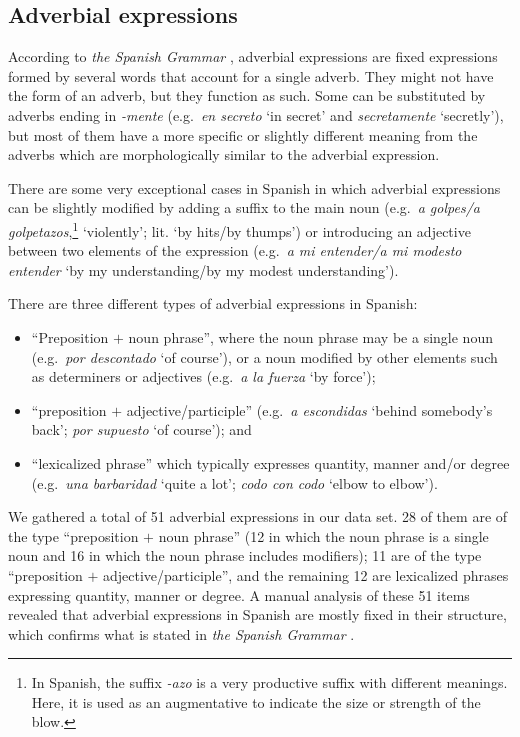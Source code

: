 \documentclass[output=paper]{langsci/langscibook}
\begin{document}
\subsection{Adverbial expressions}
\label{sssec:adverbialExps}

According to \textit{the Spanish Grammar} \citeyearpar[599]{RAE:2010}, adverbial expressions are fixed expressions formed by several words that account for a single adverb.
They might not have the form of an adverb, but they function as such.
Some can be substituted by adverbs ending in \textit{-mente} (e.g.\ \textit{en secreto} `in secret' and \textit{secretamente} `secretly'), but most of them have a more specific or slightly different meaning from the adverbs which are morphologically similar to the adverbial expression.

There are some very exceptional cases in Spanish in which adverbial expressions can be slightly modified \citep[600]{RAE:2010} by adding a suffix to the main noun (e.g.\ \textit{a golpes/a golpetazos},\footnote{In Spanish, the suffix \textit{-azo} is a very productive suffix with different meanings. Here, it is used as an augmentative to indicate the size or strength of the blow.} `violently'; lit. `by hits/by thumps') or introducing an adjective between two elements of the expression (e.g.\ \textit{a mi entender/a mi modesto entender} `by my understanding/by my modest understanding').

There are three different types of adverbial expressions in Spanish: 

\begin{itemize}
\item ``Preposition $+$ noun phrase'', where the noun phrase may be a single noun (e.g.\ \textit{por descontado} `of course'), or a noun modified by other elements such as determiners or adjectives (e.g.\ \textit{a la fuerza} `by force');
\item ``preposition $+$ adjective/participle'' (e.g.\ \textit{a escondidas} `behind somebody’s back'; \textit{por supuesto} `of course'); and
\item ``lexicalized phrase'' which typically expresses quantity, manner and/or degree (e.g.\ \textit{una barbaridad} `quite a lot'; \textit{codo con codo} `elbow to elbow').
\end{itemize}
 
We gathered a total of 51 adverbial expressions in our data set. 
28 of them are of the type ``preposition $+$ noun phrase'' (12 in which the noun phrase is a single noun and 16 in which the noun phrase includes modifiers); 11 are of the type ``preposition $+$ adjective/participle'', and the remaining 12 are lexicalized phrases expressing quantity, manner or degree.
A manual analysis of these 51 items revealed that adverbial expressions in Spanish are mostly fixed in their structure, which confirms what is stated in \textit{the Spanish Grammar} \citeyearpar[601]{RAE:2010}.
\end{document}
